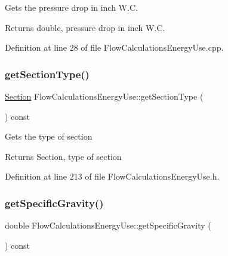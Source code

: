 Gets the pressure drop in inch W.\+C.

\begin{DoxyReturn}{Returns}
double, pressure drop in inch W.\+C. 
\end{DoxyReturn}


Definition at line 28 of file Flow\+Calculations\+Energy\+Use.\+cpp.

\mbox{\label{class_flow_calculations_energy_use_ae88cc4f93028907c4c12e8925f63266b}} 
\subsubsection{\texorpdfstring{get\+Section\+Type()}{getSectionType()}}
{\footnotesize\ttfamily \hyperlink{class_flow_calculations_energy_use_afbabab0da698748de91369a5dfc7662a}{Section} Flow\+Calculations\+Energy\+Use\+::get\+Section\+Type (\begin{DoxyParamCaption}{ }\end{DoxyParamCaption}) const\hspace{0.3cm}{\ttfamily [inline]}}

Gets the type of section

\begin{DoxyReturn}{Returns}
Section, type of section 
\end{DoxyReturn}


Definition at line 213 of file Flow\+Calculations\+Energy\+Use.\+h.

\mbox{\label{class_flow_calculations_energy_use_adc3ac2406e00a75c33be0a6a66153da3}} 
\subsubsection{\texorpdfstring{get\+Specific\+Gravity()}{getSpecificGravity()}}
{\footnotesize\ttfamily double Flow\+Calculations\+Energy\+Use\+::get\+Specific\+Gravity (\begin{DoxyParamCaption}{ }\end{DoxyParamCaption}) const\hspace{0.3cm}{\ttfamily [inline]}}

